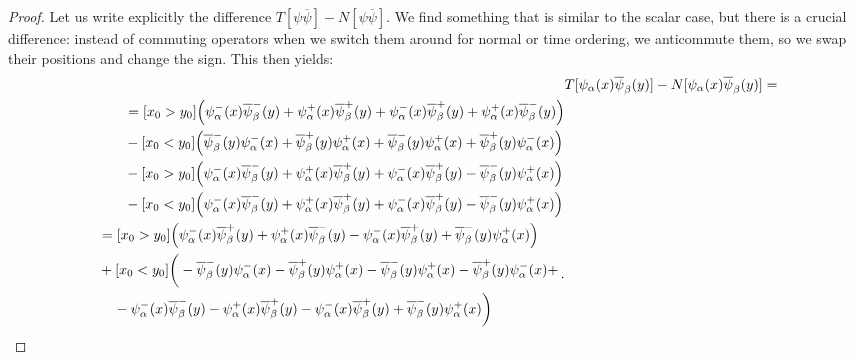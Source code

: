 \documentclass[main.tex]{subfiles}
\begin{document}
\begin{proof}
Let us write explicitly the difference \(T[\psi \overline{\psi}] - N[\psi \overline{\psi}]\). We find something that is similar to the scalar case, but there is a crucial difference: instead of commuting operators when we switch them around for normal or time ordering, we anticommute them, so we swap their positions and change the sign. This then yields: 
%
\begin{subequations}
\begin{align}
&T[\psi_{\alpha } (x) \overline{\psi}_{\beta } (y)] - N[\psi_{\alpha } (x) \overline{\psi}_{\beta } (y)] = \\
\begin{split}
&= 
[x_0 > y_0 ] \qty(
    \psi_{\alpha }^{-} (x) \overline{\psi}^{-}_{\beta }(y)+
    \psi_{\alpha }^{+} (x) \overline{\psi}^{+}_{\beta }(y)+
    \psi_{\alpha }^{-} (x) \overline{\psi}^{+}_{\beta }(y)+
    \psi_{\alpha }^{+} (x) \overline{\psi}^{-}_{\beta }(y)
) \\
&-
[x_0 < y_0 ]\qty(
    \overline{\psi}_{\beta }^{-} (y) \psi^{-}_{\alpha } (x)+
    \overline{\psi}_{\beta }^{+} (y) \psi^{+}_{\alpha } (x)+
    \overline{\psi}_{\beta }^{-} (y) \psi^{+}_{\alpha } (x)+
    \overline{\psi}_{\beta }^{+} (y) \psi^{-}_{\alpha } (x)
)  \\
&- 
[x_0 > y_0 ] \qty(
    \psi_{\alpha }^{-}(x) \overline{\psi}_{\beta }^{-}(y)+
    \psi_{\alpha }^{+}(x) \overline{\psi}_{\beta }^{+}(y)+
    \psi_{\alpha }^{-}(x) \overline{\psi}_{\beta }^{+}(y)-
    \overline{\psi}_{\beta }^{-}(y) \psi_{\alpha }^{+}(x) 
)\\
&- 
[x_0 < y_0 ] \qty(
    \psi_{\alpha }^{-}(x) \overline{\psi}_{\beta }^{-}(y)+
    \psi_{\alpha }^{+}(x) \overline{\psi}_{\beta }^{+}(y)+
    \psi_{\alpha }^{-}(x) \overline{\psi}_{\beta }^{+}(y)-
    \overline{\psi}_{\beta }^{-}(y) \psi_{\alpha }^{+}(x) 
)
\end{split}\\
\begin{split}
&= [x_0 > y_0 ]\qty(
    \psi_{\alpha }^{-} (x) \overline{\psi}^{+}_{\beta }(y)+
    \psi_{\alpha }^{+} (x) \overline{\psi}^{-}_{\beta }(y)-
    \psi_{\alpha }^{-}(x) \overline{\psi}_{\beta }^{+}(y)+
    \overline{\psi}_{\beta }^{-}(y) \psi_{\alpha }^{+}(x) 
) \\ 
&+
[x_0 < y_0 ]\bigg(-
    \overline{\psi}_{\beta }^{-} (y) \psi^{-}_{\alpha } (x)-
    \overline{\psi}_{\beta }^{+} (y) \psi^{+}_{\alpha } (x)-
    \overline{\psi}_{\beta }^{-} (y) \psi^{+}_{\alpha } (x)-
    \overline{\psi}_{\beta }^{+} (y) \psi^{-}_{\alpha } (x)+\\
    &\phantom{=}\ 
    -\psi_{\alpha }^{-}(x) \overline{\psi}_{\beta }^{-}(y)-
    \psi_{\alpha }^{+}(x) \overline{\psi}_{\beta }^{+}(y)-
    \psi_{\alpha }^{-}(x) \overline{\psi}_{\beta }^{+}(y)+
    \overline{\psi}_{\beta }^{-}(y) \psi_{\alpha }^{+}(x) 
\bigg)
\end{split}
\,.
\end{align}
\end{subequations}

\end{proof}
\end{document}
